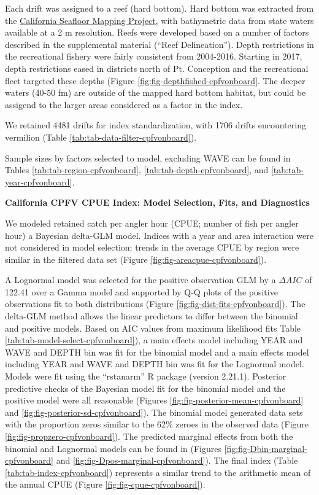 \documentclass[
  english,
  a4paper,
]{article}
\begin{document}
Each drift was assigned to a reef (hard bottom). Hard bottom was extracted from
the \href{http://seafloor.otterlabs.org/index.html}{California Seafloor Mapping Project},
with bathymetric data from state waters available at a 2 m resolution. Reefs were
developed based on a number of factors described in the supplemental material
(``Reef Delineation''). Depth restrictions in the recreational fishery were fairly
consistent from 2004-2016. Starting in 2017, depth restrictions eased in districts
north of Pt. Conception and the recreational fleet targeted these depths
(Figure \ref{fig:fig-depthfished-cpfvonboard}. The deeper waters (40-50 fm) are
outside of the mapped hard bottom habitat, but could be assigend to the larger
areas considered as a factor in the index.

We retained 4481 drifts for index standardization, with
1706 drifts encountering vermilion
(Table \ref{tab:tab-data-filter-cpfvonboard}).

Sample sizes by factors selected to model, excluding WAVE can be found in Tables
\ref{tab:tab-region-cpfvonboard}, \ref{tab:tab-depth-cpfvonboard}, and \ref{tab:tab-year-cpfvonboard}.

\textbf{California CPFV CPUE Index: Model Selection, Fits, and Diagnostics}

We modeled retained catch per angler hour (CPUE; number of fish per angler hour)
a Bayesian delta-GLM model. Indices with a year and area interaction were not
considered in model selection; trends in the average CPUE by region were similar
in the filtered data set (Figure \ref{fig:fig-areacpue-cpfvonboard}).

A Lognormal model was
selected for the positive observation GLM by
a \(\Delta AIC\) of 122.41 over a Gamma model and supported by Q-Q plots of the positive observations fit to both distributions (Figure \ref{fig:fig-dist-fits-cpfvonboard}). The delta-GLM
method allows the linear predictors to differ between the binomial and positive models.
Based on AIC values from maximum likelihood fits Table \ref{tab:tab-model-select-cpfvonboard}),
a main effects model including
YEAR and WAVE and DEPTH bin
was fit for the binomial model and a main
effects model including
YEAR and WAVE and DEPTH bin
was fit for the Lognormal model.
Models were fit using the ``rstanarm'' R package (version 2.21.1). Posterior predictive
checks of the Bayesian model fit for the binomial model and the positive model
were all reasonable (Figures \ref{fig:fig-posterior-mean-cpfvonboard} and
\ref{fig:fig-posterior-sd-cpfvonboard}). The binomial model generated data sets with the
proportion zeros similar to the 62\% zeroes in the observed data
(Figure \ref{fig:fig-propzero-cpfvonboard}). The predicted marginal effects from
both the binomial and Lognormal models can be found in (Figures \ref{fig:fig-Dbin-marginal-cpfvonboard} and \ref{fig:fig-Dpos-marginal-cpfvonboard}). The
final index (Table \ref{tab:tab-index-cpfvonboard})
represents a similar trend to the arithmetic mean of the annual CPUE (Figure \ref{fig:fig-cpue-cpfvonboard}).
\end{document}

